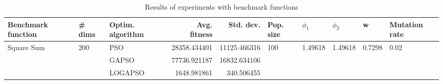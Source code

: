 \begin{table}
\centering
\caption{Results of experiments with benchmark functions}
\begin{tabular}{lllrrlllll}
\toprule
         Benchmark function &              \# dims & Optim. algorithm &  Avg. fitness &    Std. dev. &            Pop. size &               $\phi_{1}$ &               $\phi_{2}$ &                       w &         Mutation rate \\
\midrule
\multirow{3}{*}{Square Sum} & \multirow{3}{*}{200} &              PSO &  28358.434401 & 11125.466316 & \multirow{3}{*}{100} & \multirow{3}{*}{1.49618} & \multirow{3}{*}{1.49618} & \multirow{3}{*}{0.7298} & \multirow{3}{*}{0.02} \\
                            &                      &            GAPSO &  77736.921187 & 16832.634106 &                      &                          &                          &                         &                       \\
                            &                      &          LOGAPSO &   1648.981861 &   340.506455 &                      &                          &                          &                         &                       \\
\bottomrule
\end{tabular}
\end{table}
